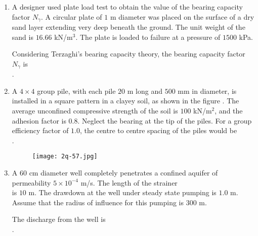 \documentclass[journal,12pt,onecolumn]{article}
\theoremstyle{remark}
\begin{document}
\begin{enumerate}
    \hfill{}
    
    \item A designer used plate load test to obtain the value of the bearing capacity factor $N_\gamma$. A circular plate of $1$ m diameter was placed on the surface of a dry sand layer extending very deep beneath the ground. The unit weight of the sand is $16.66$ kN/m$^3$. The plate is loaded to failure at a pressure of $1500$ kPa.
    
    Considering Terzaghi's bearing capacity theory, the bearing capacity factor $N_\gamma$ is \underline{\hspace{2cm}} \\ .
    
    \hfill{}
    
    \item A $4 \times 4$ group pile, with each pile $20$ m long and $500$ mm in diameter, is installed in a square pattern in a clayey soil, as shown in the figure . The average unconfined compressive strength of the soil is $100$ kN/m$^2$, and the adhesion factor is $0.8$. Neglect the bearing at the tip of the piles. For a group efficiency factor of $1.0$, the centre to centre spacing  of the piles  would be \underline{\hspace{2cm}} \\ .
    \begin{figure}[H]
        \centering
        \texttt{[image: 2q-57.jpg]}
        \caption{}
        \label{fig:q57}
    \end{figure}
    
    \hfill{}
    
    \item A $60$ cm diameter well completely penetrates a confined aquifer of permeability $5 \times 10^{-4}$ m/s. The length of the strainer \\  is $10$ m. The drawdown at the well under steady state pumping is $1.0$ m. Assume that the radius of influence for this pumping is $300$ m.
    
    The discharge from the well  is \underline{\hspace{2cm}} \\ .
    

\end{enumerate}
\end{document}
